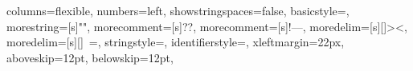 {
	columns=flexible,
	numbers=left,
	showstringspaces=false,
	basicstyle=\small\ttfamily\color{black},
	morestring=[s]{"}{"},
	morecomment=[s]{?}{?},
	morecomment=[s]{!--}{--},
	moredelim=[s][\color{black}]{>}{<},
	moredelim=[s][\color{black}]{\ }{=},
	stringstyle=\color{red},
	identifierstyle=\color{black},
	xleftmargin=22px,
	aboveskip=12pt,
	belowskip=12pt,
}